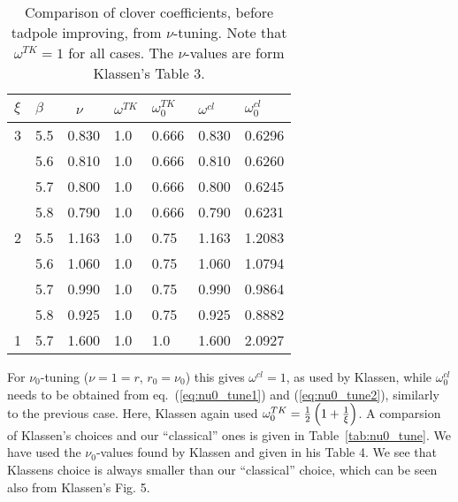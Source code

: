 \documentclass[12pt]{article}
\begin{document}
\begin{table} \centering
\begin{tabular}{| l | l | l || l | l || l | l |}
\hline
$\xi$  & $\beta$ & ~$\nu$ & $\omega^{TK}$ & $\omega^{TK}_0$ & $\omega^{cl}$ &
 $\omega^{cl}_0$ \\ \hline
 3  &   5.5  & 0.830 & 1.0 & 0.666 & 0.830 & 0.6296 \\
    &   5.6  & 0.810 & 1.0 & 0.666 & 0.810 & 0.6260 \\
    &   5.7  & 0.800 & 1.0 & 0.666 & 0.800 & 0.6245 \\
    &   5.8  & 0.790 & 1.0 & 0.666 & 0.790 & 0.6231 \\
\hline
 2  &   5.5  & 1.163 & 1.0 & 0.75  & 1.163 & 1.2083 \\
    &   5.6  & 1.060 & 1.0 & 0.75  & 1.060 & 1.0794 \\
    &   5.7  & 0.990 & 1.0 & 0.75  & 0.990 & 0.9864 \\
    &   5.8  & 0.925 & 1.0 & 0.75  & 0.925 & 0.8882 \\
\hline
 1  &   5.7  & 1.600 & 1.0 & 1.0   & 1.600 & 2.0927 \\
\hline
\end{tabular}
\caption{Comparison of clover coefficients, before tadpole improving,
from $\nu$-tuning. Note that $\omega^{TK} = 1$ for all cases. The $\nu$-values
are form Klassen's Table 3.}
\label{tab:nu_tune}
\end{table}

For $\nu_0$-tuning ($\nu = 1 = r$, $r_0 = \nu_0$) this gives $\omega^{cl} = 1$,
as used by Klassen, while $\omega^{cl}_0$ needs to be obtained from
eq.~(\ref{eq:nu0_tune1}) and (\ref{eq:nu0_tune2}), similarly to the previous
case. Here, Klassen again used $\omega^{TK}_0 = \frac{1}{2} \left( 1 + \frac{1}{\xi}
\right)$. A comparsion of Klassen's choices and our ``classical'' ones
is given in Table~\ref{tab:nu0_tune}. We have used the $\nu_0$-values found
by Klassen and given in his Table 4. We see that Klassens choice is always
smaller than our ``classical'' choice, which can be seen also from Klassen's
Fig. 5.
\end{document}
